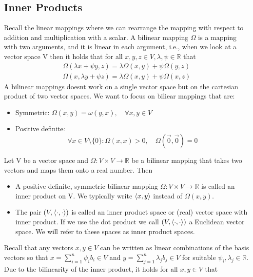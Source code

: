 \subsection*{Inner Products}
Recall the linear mappings where we can rearrange the mapping with respect to addition and multiplication with a scalar. A bilinear mapping $\Omega$ is a mapping with two arguments, and it is linear in each argument, i.e., when we look at a vector space V then it holds that for all $x,y,z \in V, \lambda, \psi \in \mathbb{R}$ that
\begin{align*}
    \Omega(\lambda x+ \psi y, z) = \lambda\Omega(x,y) + \psi\Omega(y,z)\\
    \Omega(x,\lambda y+ \psi z) = \lambda\Omega(x,y) + \psi \Omega(x,z)
\end{align*}
A bilinear mappings doesnt work on a single vector space but on the cartesian product of two vector spaces. We want to focus on biliear mappings that are: \begin{itemize}
    \item Symmetric: $\Omega(x,y)= \omega(y,x), \quad \forall x,y \in V$
    \item Positive definite: \[ 
        \forall x \in V\setminus\{0\} : \Omega(x,x) >0, \quad \Omega(\vec{0},\vec{0})= 0
    \]
\end{itemize}
\begin{definition}
    Let V be a vector space and $\Omega: V \times V \longrightarrow \mathbb{R}$ be a bilinear mapping that takes two vectors and maps them onto a real number. Then
    \begin{itemize}
        \item A positive definite, symmetric bilinear mapping $\Omega: V \times V \longrightarrow \mathbb{R}$ is called an inner product on V. We typically write $\left\langle x,y\right\rangle$ instead of $\Omega(x,y)$.
        \item The pair $(V,\left\langle\cdot, \cdot\right\rangle)$ is called an inner product space or (real) vector space with inner product. If we use the dot product we call $(V,\left\langle\cdot, \cdot\right\rangle)$ a Euclidean vector space. We will refer to these spaces as inner product spaces. 
    \end{itemize}
\end{definition}
Recall that any vectors $x,y \in V$ can be written as linear combinations of the basis vectors so that $x = \sum_{i=1}^{n}{\psi_i b_i} \in V$ and $y = \sum_{j=1}^{n}{\lambda_j b_j} \in V$ for suitable $\psi_i,\lambda_j \in \mathbb{R}$. Due to the bilinearity of the inner product, it holds for all $x,y \in V$ that
